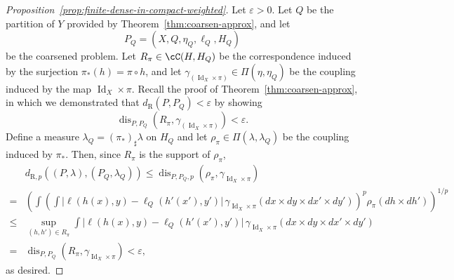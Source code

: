 \documentclass[twoside,11pt]{article}
\DeclareMathOperator{\id}{Id}
\newcommand{\dexp}[1][]{d_{\mathrm{R}#1}}
\DeclareMathOperator{\dis}{dis}
\renewcommand{\epsilon}{\varepsilon}
\begin{document}
\begin{proof}[Proposition~\ref{prop:finite-dense-in-compact-weighted}]
    Let $\epsilon > 0$. Let $Q$ be the partition of $Y$ provided by Theorem~\ref{thm:coarsen-approx}, and let
    \[P_Q = (X,Q,\eta_Q,\ell_Q,H_Q)\]
    be the coarsened problem. Let $R_\pi \in \cC(H,H_Q)$ be the correspondence induced by the surjection $\pi_*(h) = \pi\circ h$, and let $\gamma_{(\id_X \times \pi)} \in \Pi(\eta,\eta_Q)$ be the coupling induced by the map $\id_X\times \pi$. Recall the proof of Theorem~\ref{thm:coarsen-approx}, in which we demonstrated that $\dexp(P,P_Q)<\epsilon$ by showing
    \[\dis_{P,P_Q}(R_\pi, \gamma_{(\id_X\times \pi)})<\epsilon.\]
    Define a measure $\lambda_Q = (\pi_*)_\sharp \lambda$ on $H_Q$ and let $\rho_{\pi} \in \Pi(\lambda,\lambda_Q)$ be the coupling induced by $\pi_*$. Then, since $R_\pi$ is the support of $\rho_\pi$,
    \begin{align*}
        &\dexp[,p]((P,\lambda),(P_Q,\lambda_Q))
        \leq
        \dis_{P,P_Q,p}(\rho_\pi, \gamma_{\id_X\times \pi})
        \\ = &
        \left(\int \left(
            \int \big| \ell(h(x),y) - \ell_Q(h'(x'),y')\big|\, 
            \gamma_{\id_X\times \pi}(dx{\times}dy{\times}dx'{\times}dy')
        \right)^p \rho_{\pi}(dh{\times}dh')
        \right)^{1/p}
        \\ \leq &
        \sup_{(h,h') \in R_\pi}
            \int \big| \ell(h(x),y) - \ell_Q(h'(x'),y')\big|\, 
            \gamma_{\id_X\times \pi}(dx{\times}dy{\times}dx'{\times}dy')
        \\  = & \dis_{P,P_Q}(R_\pi,\gamma_{\id_X\times \pi}) < \epsilon,
    \end{align*}
    as desired.
\end{proof}
\end{document}
